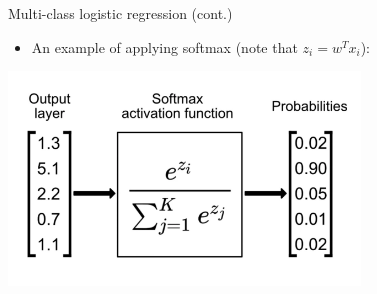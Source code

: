 \documentclass[serif, aspectratio=169]{beamer}
\begin{document}
    \begin{frame}{Multi-class logistic regression (cont.)}
        \begin{itemize}
            \item An example of applying softmax (note that $z_i=w^Tx_i$):
        \end{itemize}
        \begin{center}
            \includegraphics[width=0.7\textwidth]{pic/softmax0.png}

        \end{center}
    \end{frame}
\end{document}
